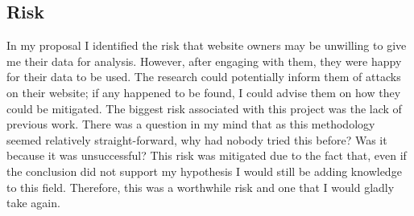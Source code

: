 \subsection{Risk}

In my proposal I identified the risk that website owners may be unwilling to give me their data for analysis. However, after engaging with them, they were happy for their data to be used. The research could potentially inform them of attacks on their website; if any happened to be found, I could advise them on how they could be mitigated. The biggest risk associated with this project was the lack of previous work. There was a question in my mind that as this methodology seemed relatively straight-forward, why had nobody tried this before? Was it because it was unsuccessful? This risk was mitigated due to the fact that, even if the conclusion did not support my hypothesis I would still be adding knowledge to this field. Therefore, this was a worthwhile risk and one that I would gladly take again.